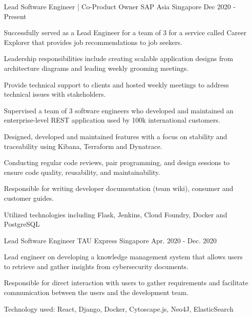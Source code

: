 

\begin{cventries}

  \cventry
    {Lead Software Engineer | Co-Product Owner} %
    {SAP Asia} %
    {Singapore} %
    {Dec 2020 - Present} %
    {
      \begin{cvitems} %
        \item {Successfully served as a Lead Engineer for a team of 3 for a service called Career Explorer that provides job recommendations to job seekers.}
        \item {Leadership responsibilities include creating scalable application designs from architecture diagrams and leading weekly grooming meetings.}
        \item {Provide technical support to clients and hosted weekly meetings to address technical issues with stakeholders. }
        \item {Supervised a team of 3 software engineers who developed and maintained an enterprise-level REST application used by 100k international customers.}
        \item {Designed, developed and maintained features with a focus on stability and traceability using Kibana, Terraform and Dynatrace. }
        \item {Conducting regular code reviews, pair programming, and design sessions to ensure code quality, reusability, and maintainability. }
        \item {Responsible for writing developer documentation (team wiki), consumer and customer guides. }
        \item {Utilized technologies including Flask, Jenkins, Cloud Foundry, Docker and PostgreSQL}
      \end{cvitems}
    }

  \cventry
    {Lead Software Engineer} %
    {TAU Express} %
    {Singapore} %
    {Apr. 2020 - Dec. 2020} %
    {
      \begin{cvitems} %
        \item {Lead engineer on developing a knowledge management system that allows users to retrieve and gather insights from cybersecurity documents.}
        \item {Responsible for direct interaction with users to gather requirements and facilitate communication between the users and the development team.}
        \item {Technology used: React, Django, Docker, Cytoscape.js, Neo4J, ElasticSearch}
     \end{cvitems}
    }


\end{cventries}
